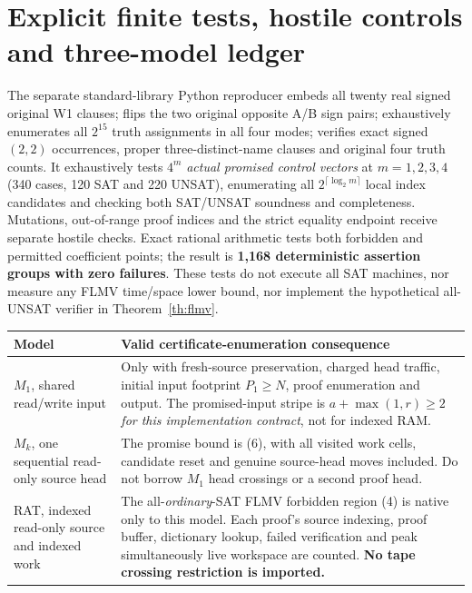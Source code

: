 \documentclass[11pt]{article}
\begin{document}
\section{Explicit finite tests, hostile controls and three-model ledger}
The separate standard-library Python reproducer embeds all twenty
real signed original W1 clauses; flips the two original opposite
A/B sign pairs; exhaustively enumerates all $2^{15}$ truth assignments
in all four modes; verifies exact signed $(2,2)$ occurrences, proper
three-distinct-name clauses and original four truth counts.
It exhaustively tests $4^m$ \emph{actual promised control vectors}
at $m=1,2,3,4$ (340 cases, 120 SAT and 220 UNSAT),
enumerating all $2^{\lceil\log_2m\rceil}$ local index candidates
and checking both SAT/UNSAT soundness and completeness. Mutations,
out-of-range proof indices and the strict equality endpoint receive
separate hostile checks. Exact rational arithmetic tests both
forbidden and permitted coefficient points; the result is
\textbf{1,168 deterministic assertion groups with zero failures}.
These tests do not execute all SAT machines, nor measure any FLMV
time/space lower bound, nor implement the hypothetical all-UNSAT
verifier in Theorem~\ref{th:flmv}.

\begin{center}\small
\begin{tabularx}{.96\linewidth}{p{.18\linewidth}X}
\toprule
Model & Valid certificate-enumeration consequence\\\midrule
$M_1$, shared read/write input &
Only with fresh-source preservation, charged head traffic,
initial input footprint $P_1\ge N$, proof enumeration and output.
The promised-input stripe is $a+\max(1,r)\ge2$ \emph{for
this implementation contract}, not for indexed RAM.\\
$M_k$, one sequential read-only source head &
The promise bound is (6), with all visited work cells,
candidate reset and genuine source-head moves included.
Do not borrow $M_1$ head crossings or a second proof head.\\
RAT, indexed read-only source and indexed work &
The all-\emph{ordinary}-SAT FLMV forbidden region (4)
is native only to this model. Each proof's source indexing,
proof buffer, dictionary lookup, failed verification and
peak simultaneously live workspace are counted.
\textbf{No tape crossing restriction is imported.}\\\bottomrule
\end{tabularx}
\end{center}
\end{document}
